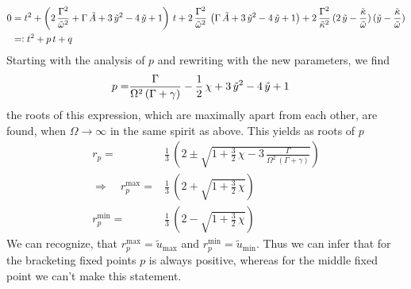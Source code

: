 \documentclass{article}
\begin{document}
\begin{align*}
    0&=t^2+\left( 2\,\frac{\Gamma^2}{\tilde{\omega}^2}+\Gamma\,\tilde{A}+3\,\tilde{y}^2-4\,\tilde{y}+1  \right)\,t+2\,\frac{\Gamma^2}{\tilde{\omega}^2}\,\left( \Gamma\,\tilde{A}+3\,\tilde{y}^2-4\,\tilde{y}+1 \right)+2\,\frac{\Gamma^2}{\tilde{\kappa}^2}\,(2\,\tilde{y}-\frac{\tilde{\kappa}}{\tilde{\omega}})\,(\tilde{y}-\frac{\tilde{\kappa}}{\tilde{\omega}})\\
    &=\vcentcolon t^2+p\,t+q
\end{align*}
Starting with the analysis of $p$ and rewriting with the new parameters, we find 
\begin{align*}
    p=&\frac{\Gamma}{\Omega^2\,(\Gamma+\gamma)}-\frac{1}{2}\,\chi+3\,\tilde{y}^2-4\,\tilde{y}+1
\end{align*}
the roots of this expression, which are maximally apart from each other, are found, when $\Omega\rightarrow\infty$ in the same spirit as above. This yields as roots of $p$
\begin{align*}
    r_p=&\frac{1}{3}\,\left( 2\pm\sqrt{1+\frac{3}{2}\,\chi-3\,\frac{\Gamma}{\Omega^2\,(\Gamma+\gamma)}} \right)\\
    \Rightarrow\quad r_p^\text{max}=&\frac{1}{3}\,\left( 2+\sqrt{1+\frac{3}{2}\,\chi} \right)\\
    r_p^\text{min}=&\frac{1}{3}\,\left( 2-\sqrt{1+\frac{3}{2}\,\chi} \right)
\end{align*}
We can recognize, that $r_p^\text{max}=\tilde{u}_\text{max}$ and $r_p^\text{min}=\tilde{u}_\text{min}$. Thus we can infer that for the bracketing fixed points $p$ is always positive, whereas for the middle fixed point we can't make this statement.
\end{document}
